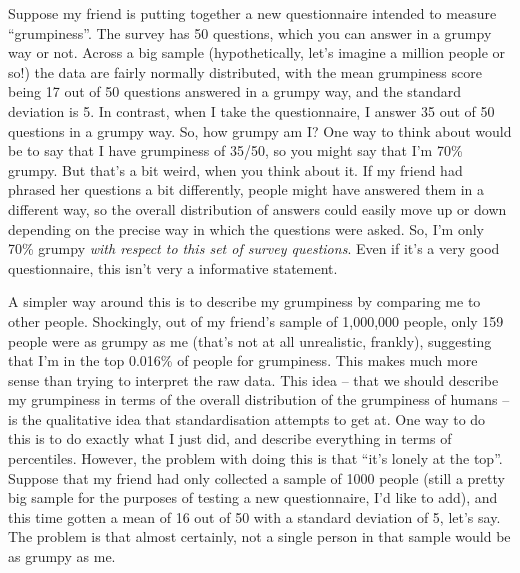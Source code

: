 Suppose my friend is putting together a new questionnaire intended to measure ``grumpiness''. The survey has 50 questions, which you can answer in a grumpy way or not. Across a big sample (hypothetically, let's imagine a million people or so!) the data are fairly normally distributed, with the mean grumpiness score being 17 out of 50 questions answered in a grumpy way, and the standard deviation is 5. In contrast, when I take the questionnaire, I answer 35 out of 50 questions in a grumpy way. So, how grumpy am I? One way to think about would be to say that I have grumpiness of 35/50, so you might say that I'm 70\% grumpy. But that's a bit weird, when you think about it. If my friend had phrased her questions a bit differently, people might have answered them in a different way, so the overall distribution of answers could easily move up or down depending on the precise way in which the questions were asked. So, I'm only 70\% grumpy {\it with respect to this set of survey questions}. Even if it's a very good questionnaire, this isn't very a informative statement. 

A simpler way around this is to describe my grumpiness by comparing me to other people. Shockingly, out of my friend's sample of 1,000,000 people, only 159 people were as grumpy as me (that's not at all unrealistic, frankly), suggesting that I'm in the top 0.016\% of people for grumpiness. This makes much more sense than trying to interpret the raw data. This idea -- that we should describe my grumpiness in terms of the overall distribution of the grumpiness of humans -- is the qualitative idea that standardisation attempts to get at. One way to do this is to do exactly what I just did, and describe everything in terms of percentiles. However, the problem with doing this is that ``it's lonely at the top''. Suppose that my friend had only collected a sample of 1000 people (still a pretty big sample for the purposes of testing a new questionnaire, I'd like to add), and this time gotten a mean of 16 out of 50 with a standard deviation of 5, let's say. The problem is that almost certainly, not a single person in that sample would be as grumpy as me.


